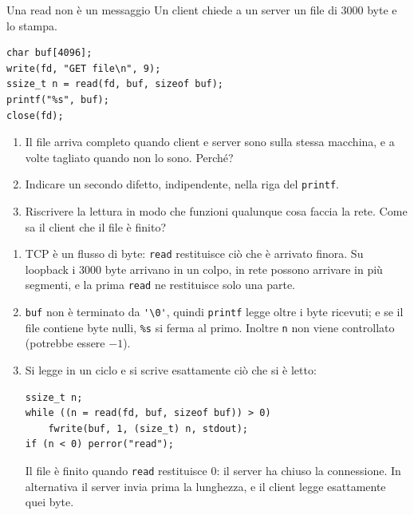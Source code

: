 \begin{esercizio}{Una read non è un messaggio}
Un client chiede a un server un file di 3000 byte e lo stampa.
\begin{lstlisting}[language={[POSIX]C}]
char buf[4096];
write(fd, "GET file\n", 9);
ssize_t n = read(fd, buf, sizeof buf);
printf("%s", buf);
close(fd);
\end{lstlisting}
\begin{enumerate}[label=(\alph*)]
    \item Il file arriva completo quando client e server sono sulla stessa macchina, e a volte tagliato quando non lo sono. Perché?
    \item Indicare un secondo difetto, indipendente, nella riga del \texttt{printf}.
    \item Riscrivere la lettura in modo che funzioni qualunque cosa faccia la rete. Come sa il client che il file è finito?
\end{enumerate}

\svolgimento
\begin{enumerate}[label=(\alph*)]
    \item TCP è un flusso di byte: \texttt{read} restituisce ciò che è arrivato finora. Su loopback i 3000 byte arrivano in un colpo, in
          rete possono arrivare in più segmenti, e la prima \texttt{read} ne restituisce solo una parte.
    \item \texttt{buf} non è terminato da \verb|'\0'|, quindi \texttt{printf} legge oltre i byte ricevuti; e se il file contiene byte nulli,
          \texttt{\%s} si ferma al primo. Inoltre \texttt{n} non viene controllato (potrebbe essere $-1$).
    \item Si legge in un ciclo e si scrive esattamente ciò che si è letto:
\begin{lstlisting}[language={[POSIX]C}]
ssize_t n;
while ((n = read(fd, buf, sizeof buf)) > 0)
    fwrite(buf, 1, (size_t) n, stdout);
if (n < 0) perror("read");
\end{lstlisting}
          Il file è finito quando \texttt{read} restituisce 0: il server ha chiuso la connessione. In alternativa il server invia prima la
          lunghezza, e il client legge esattamente quei byte.
\end{enumerate}
\end{esercizio}


